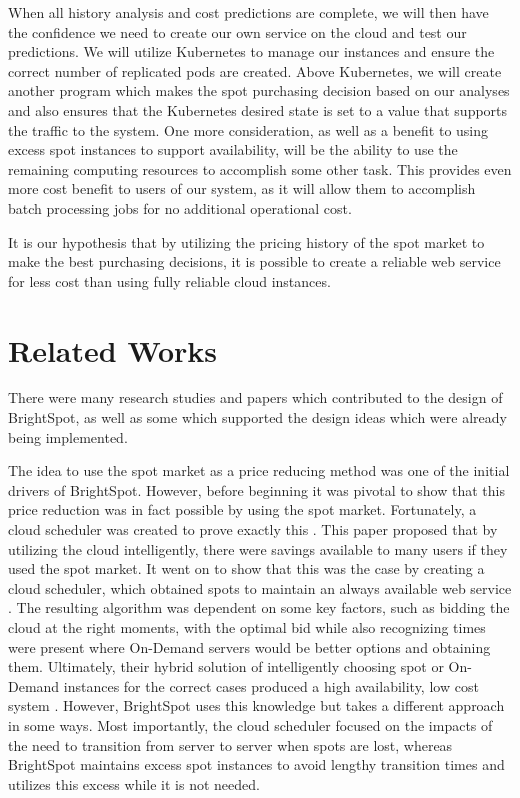\documentclass[thesis,proposal]{umassthesis}  %
\begin{document}
When all history analysis and cost predictions are complete, we will then have the confidence we need to create our own service on the cloud and test our predictions. We will utilize Kubernetes to manage our instances and ensure the correct number of replicated pods are created. Above Kubernetes, we will create another program which makes the spot purchasing decision based on our analyses and also ensures that the Kubernetes desired state is set to a value that supports the traffic to the system. One more consideration, as well as a benefit to using excess spot instances to support availability, will be the ability to use the remaining computing resources to accomplish some other task. This provides even more cost benefit to users of our system, as it will  allow them to accomplish batch processing jobs for no additional operational cost. 

    It is our hypothesis that by utilizing the pricing history of the spot market to make the best purchasing decisions, it is possible to create a reliable web service for less cost than using fully reliable cloud instances.









\chapter{Related Works}

There were many research studies and papers which contributed to the design of BrightSpot, as well as some which supported the design ideas which were already being implemented.\par

The idea to use the spot market as a price reducing method was one of the initial drivers of BrightSpot. However, before beginning it was pivotal to show that this price reduction was in fact possible by using the spot market. Fortunately, a cloud scheduler was created to prove exactly this \cite{CuttingCostSpot}. This paper proposed that by utilizing the cloud intelligently, there were savings available to many users if they used the spot market. It went on to show that this was the case by creating a cloud scheduler, which obtained spots to maintain an always available web service \cite{CuttingCostSpot}. The resulting algorithm was dependent on some key factors, such as bidding the cloud at the right moments, with the optimal bid while also recognizing times were present where On-Demand servers would be better options and obtaining them. Ultimately, their hybrid solution of intelligently choosing spot or On-Demand instances for the correct cases produced a high availability, low cost system \cite{CuttingCostSpot}. However, BrightSpot uses this knowledge but takes a different approach in some ways. Most importantly, the cloud scheduler focused on the impacts of the need to transition from server to server when spots are lost, whereas BrightSpot maintains excess spot instances to avoid lengthy transition times and utilizes this excess while it is not needed.\par
\end{document}
